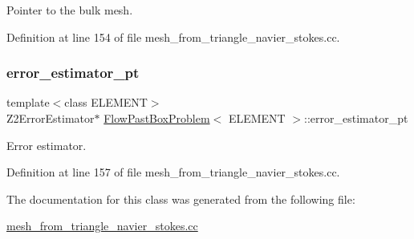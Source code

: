 Pointer to the bulk mesh. 



Definition at line 154 of file mesh\+\_\+from\+\_\+triangle\+\_\+navier\+\_\+stokes.\+cc.

\mbox{\label{classFlowPastBoxProblem_a44b20a7eb85ce8a902da6c6275f45278}} 
\subsubsection{\texorpdfstring{error\+\_\+estimator\+\_\+pt}{error\_estimator\_pt}}
{\footnotesize\ttfamily template$<$class E\+L\+E\+M\+E\+NT$>$ \\
Z2\+Error\+Estimator$\ast$ \hyperlink{classFlowPastBoxProblem}{Flow\+Past\+Box\+Problem}$<$ E\+L\+E\+M\+E\+NT $>$\+::error\+\_\+estimator\+\_\+pt\hspace{0.3cm}{\ttfamily [private]}}



Error estimator. 



Definition at line 157 of file mesh\+\_\+from\+\_\+triangle\+\_\+navier\+\_\+stokes.\+cc.



The documentation for this class was generated from the following file\+:\begin{DoxyCompactItemize}
\item 
\hyperlink{mesh__from__triangle__navier__stokes_8cc}{mesh\+\_\+from\+\_\+triangle\+\_\+navier\+\_\+stokes.\+cc}\end{DoxyCompactItemize}
